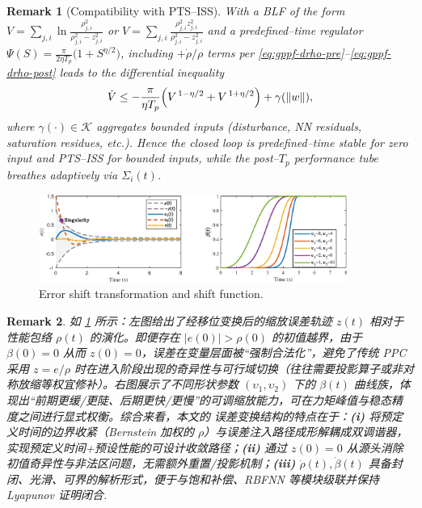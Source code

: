 \documentclass[pdflatex,sn-mathphys-num]{sn-jnl}%
\theoremstyle{thmstyleone}%
\theoremstyle{thmstyletwo}%
\newtheorem{remark}{Remark}%
\theoremstyle{thmstylethree}%
\begin{document}
\begin{remark}[Compatibility with PTS–ISS]
With a BLF of the form $V=\sum_{j,i}\ln\frac{\rho_{j,i}^2}{\rho_{j,i}^2-z_{j,i}^2}$ or $V=\sum_{j,i}\frac{\rho_{j,i}^2 z_{j,i}^2}{\rho_{j,i}^2-z_{j,i}^2}$ and a predefined–time regulator
$\Psi(S)=\frac{\pi}{2\eta T_p}\bigl(1+S^{\eta/2}\bigr)$,
including $+\dot\rho/\rho$ terms per \eqref{eq:gppf-drho-pre}–\eqref{eq:gppf-drho-post}
leads to the differential inequality
\[
\dot V \le -\frac{\pi}{\eta T_p}\Bigl(V^{\,1-\eta/2}+V^{\,1+\eta/2}\Bigr)+\gamma(\|w\|),
\]
where $\gamma(\cdot)\in\mathcal K$ aggregates bounded inputs (disturbance, NN residuals, saturation residues, etc.). Hence the closed loop is predefined–time stable for zero input and PTS–ISS for bounded inputs, while the post–$T_p$ performance tube breathes adaptively via $\Sigma_i(t)$.
\end{remark}



\begin{figure}[H]
	\centering
	\includegraphics[width=0.9\textwidth]{fig1.eps}
	\caption{Error shift transformation and shift function.}
	\label{fig:1}
\end{figure}
\begin{remark}
	如 \cref{fig:1} 所示：左图给出了经移位变换后的缩放误差轨迹 $z(t)$ 相对于性能包络 $\rho(t)$ 的演化。即便存在 $|e(0)|>\rho(0)$ 的初值越界，由于 $\beta(0)=0$ 从而 $z(0)=0$，误差在变量层面被“强制合法化”，避免了传统 PPC 采用 $z=e/\rho$ 时在进入阶段出现的奇异性与可行域切换（往往需要投影算子或非对称放缩等权宜修补）。右图展示了不同形状参数 $(\upsilon_1,\upsilon_2)$ 下的 $\beta(t)$ 曲线族，体现出“前期更缓/更陡、后期更快/更慢”的可调缩放能力，可在力矩峰值与稳态精度之间进行显式权衡。综合来看，本文的 误差变换结构的特点在于：\textbf{(i)} 将预定义时间的边界收紧（Bernstein 加权的 $\rho$）与误差注入路径成形解耦成双调谐器，实现预定义时间+预设性能的可设计收敛路径；\textbf{(ii)} 通过 $z(0)=0$ 从源头消除初值奇异性与非法区问题，无需额外重置/投影机制；\textbf{(iii)} $\dot\rho(t),\dot\beta(t)$ 具备封闭、光滑、可界的解析形式，便于与饱和补偿、RBFNN 等模块级联并保持 Lyapunov 证明闭合.
	\end{remark}
	
\end{document}

